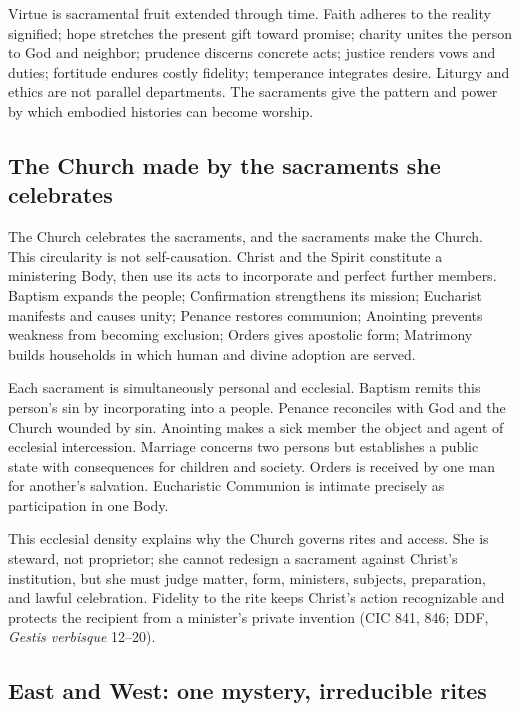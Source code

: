 Virtue is sacramental fruit extended through time. Faith adheres to the reality signified; hope stretches the present gift toward promise; charity unites the person to God and neighbor; prudence discerns concrete acts; justice renders vows and duties; fortitude endures costly fidelity; temperance integrates desire. Liturgy and ethics are not parallel departments. The sacraments give the pattern and power by which embodied histories can become worship.

\subsection{The Church made by the sacraments she celebrates}

The Church celebrates the sacraments, and the sacraments make the Church. This circularity is not self-causation. Christ and the Spirit constitute a ministering Body, then use its acts to incorporate and perfect further members. Baptism expands the people; Confirmation strengthens its mission; Eucharist manifests and causes unity; Penance restores communion; Anointing prevents weakness from becoming exclusion; Orders gives apostolic form; Matrimony builds households in which human and divine adoption are served.

Each sacrament is simultaneously personal and ecclesial. Baptism remits this person's sin by incorporating into a people. Penance reconciles with God and the Church wounded by sin. Anointing makes a sick member the object and agent of ecclesial intercession. Marriage concerns two persons but establishes a public state with consequences for children and society. Orders is received by one man for another's salvation. Eucharistic Communion is intimate precisely as participation in one Body.

This ecclesial density explains why the Church governs rites and access. She is steward, not proprietor; she cannot redesign a sacrament against Christ's institution, but she must judge matter, form, ministers, subjects, preparation, and lawful celebration. Fidelity to the rite keeps Christ's action recognizable and protects the recipient from a minister's private invention (CIC 841, 846; DDF, \emph{Gestis verbisque} 12--20).

\subsection{East and West: one mystery, irreducible rites}

